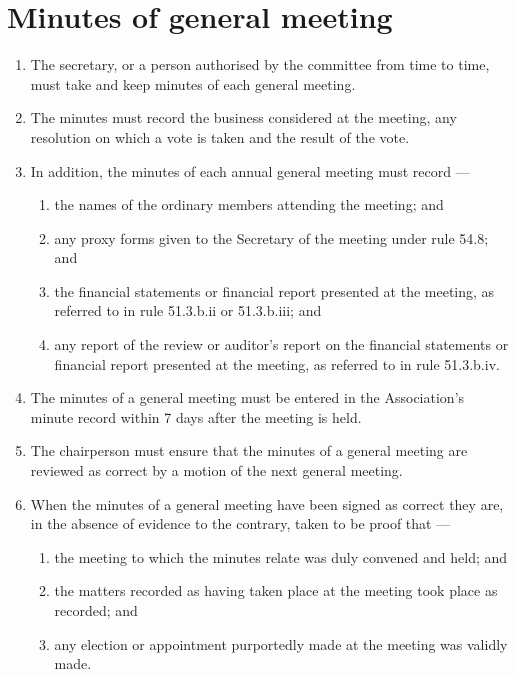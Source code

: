 \hypertarget{minutes-of-general-meeting}{%
\section{Minutes of general meeting}\label{minutes-of-general-meeting}}

\begin{enumerate}

\item The secretary, or a person authorised by the committee from time to time, must take and keep minutes of each general meeting.
\item The minutes must record the business considered at the meeting, any resolution on which a vote is taken and the result of the vote.
\item In addition, the minutes of each annual general meeting must record ---

  \begin{enumerate}
  
  \item the names of the ordinary members attending the meeting; and
  \item any proxy forms given to the Secretary of the meeting under rule 54.8; and
  \item the financial statements or financial report presented at the meeting, as referred to in rule 51.3.b.ii or 51.3.b.iii; and
  \item any report of the review or auditor's report on the financial statements or financial report presented at the meeting, as referred to in rule 51.3.b.iv.
  \end{enumerate}
\item The minutes of a general meeting must be entered in the Association's minute record within 7 days after the meeting is held.
\item The chairperson must ensure that the minutes of a general meeting are reviewed as correct by a motion of the next general meeting.
\item When the minutes of a general meeting have been signed as correct they are, in the absence of evidence to the contrary, taken to be proof that ---

  \begin{enumerate}
  
  \item the meeting to which the minutes relate was duly convened and held; and
  \item the matters recorded as having taken place at the meeting took place as recorded; and
  \item any election or appointment purportedly made at the meeting was validly made.
  \end{enumerate}
\end{enumerate}

